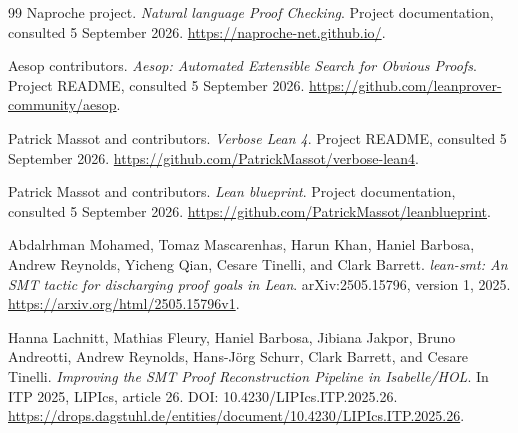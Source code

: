 \documentclass[11pt,a4paper]{article}
\theoremstyle{remark}
\begin{document}
\begin{thebibliography}{99}
Naproche project. \emph{Natural language Proof Checking}. Project documentation, consulted 5 September 2026.
\url{https://naproche-net.github.io/}.

Aesop contributors. \emph{Aesop: Automated Extensible Search for Obvious Proofs}. Project README, consulted 5 September 2026.
\url{https://github.com/leanprover-community/aesop}.

Patrick Massot and contributors. \emph{Verbose Lean 4}. Project README, consulted 5 September 2026.
\url{https://github.com/PatrickMassot/verbose-lean4}.

Patrick Massot and contributors. \emph{Lean blueprint}. Project documentation, consulted 5 September 2026.
\url{https://github.com/PatrickMassot/leanblueprint}.

Abdalrhman Mohamed, Tomaz Mascarenhas, Harun Khan, Haniel Barbosa, Andrew Reynolds, Yicheng Qian, Cesare Tinelli, and Clark Barrett.
\emph{lean-smt: An SMT tactic for discharging proof goals in Lean}. arXiv:2505.15796, version 1, 2025.
\url{https://arxiv.org/html/2505.15796v1}.

Hanna Lachnitt, Mathias Fleury, Haniel Barbosa, Jibiana Jakpor, Bruno Andreotti, Andrew Reynolds, Hans-Jörg Schurr, Clark Barrett, and Cesare Tinelli.
\emph{Improving the SMT Proof Reconstruction Pipeline in Isabelle/HOL}. In ITP 2025, LIPIcs, article 26. DOI: 10.4230/LIPIcs.ITP.2025.26.
\url{https://drops.dagstuhl.de/entities/document/10.4230/LIPIcs.ITP.2025.26}.

\end{thebibliography}
\end{document}
